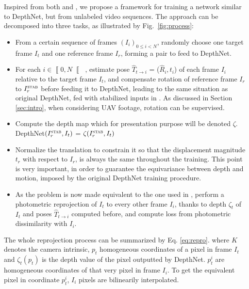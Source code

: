 \documentclass[runningheads]{llncs}
\begin{document}
Inspired from both \cite{zhou2017unsupervised} and \cite{isprs-annals-IV-2-W3-67-2017}, we propose a framework for training a network similar to DepthNet, but from unlabeled video sequences. The approach can be decomposed into three tasks, as illustrated by Fig.~\ref{fig:process}:
\begin{itemize}
\item From a certain sequence of frames $(I_i)_{0 \leq i < N}$, randomly choose one target frame $I_t$ and one reference frame
$I_r$, forming a pair to feed to DepthNet.
\item For each $i \in \left\llbracket 0,N \right\llbracket$ , estimate pose $\widehat{T}_{t\rightarrow i}$ = ($\widehat{R}_i, t_i$) of each frame $I_i$ relative to the target frame $I_t$, and compensate rotation of reference frame $I_r$ to $I^\textsc{stab}_r$ before feeding it to DepthNet, leading to the same situation as original DepthNet, fed with stabilized inputs in \cite{isprs-annals-IV-2-W3-67-2017}. As discussed in Section
\ref{sec:intro}, when considering UAV footage, rotation can be supervised.
\item Compute the depth map which for presentation purpose will be
denoted
$\zeta$. DepthNet$(I^\textsc{stab}_r, I_t)$ = $\zeta(I^\textsc{stab}_r, I_t)$
\item
Normalize the translation
to constrain it so that the displacement magnitude $t_r$ with respect to $I_r$, is always the same throughout the training. This point is very important,
in order to guarantee the
equivariance between depth and motion,
imposed by the original DepthNet training procedure.
\item As the problem is now made equivalent to the one used in \cite{zhou2017unsupervised}, perform a photometric reprojection of $I_t$ to every other frame $I_i$, thanks to depth $\zeta_t$ of $I_t$ and poses $\widehat{T}_{t \rightarrow i}$ computed before, and compute loss from photometric dissimilarity with $I_i$.
\end{itemize}

The whole reprojection process can be summarized by Eq. \ref{eq:repro}. where $K$ denotes the camera intrinsic, $p_t$ homogeneous coordinates of a pixel in frame $I_t$ and $\zeta_t(p_t)$ is the depth value of the pixel outputted by DepthNet. $p^i_t$ are homogeneous coordinates of that very pixel in frame $I_i$. To get the equivalent pixel in coordinate $p^i_t$,
$I_i$ pixels are bilinearily interpolated.
\end{document}
